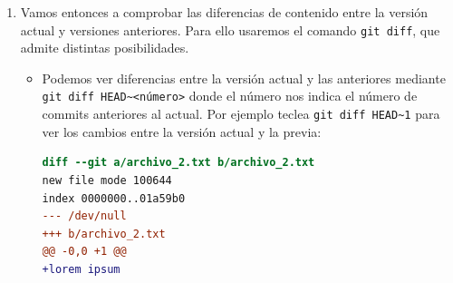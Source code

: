 \documentclass[a4paper,11pt]{report}
\newcommand{\cverb}{\Verb}
\begin{document}
\begin{enumerate}
\begin{lstlisting}[style=custom]
commit 9a9ea9821aed745099708b9f4e551b5516425c5a (HEAD -> main)
Author: hectornieto <hector.nieto.solana@gmail.com>
Date:   Sun May 9 11:53:12 2021 +0200

    Added new module archivo_2

commit f0cf4797ed331ee16d2ac5efe23a41f250436f0f
Author: hectornieto <hector.nieto.solana@gmail.com>
Date:   Sun May 9 11:50:28 2021 +0200

    Added a second line of code

commit 062ccfc2447929add19a36cf6b898b91bd005c90
Author: hectornieto <hector.nieto.solana@gmail.com>
Date:   Sun May 9 11:20:48 2021 +0200

    Fix inital bug

commit ba43a6b0218f5812cd6d4f445231c13819f4bb19
Author: hectornieto <hector.nieto.solana@gmail.com>
Date:   Sun May 9 10:39:02 2021 +0200

    My first commit
    \end{lstlisting}
    
    Por otro lado, con \cverb+git log --oneline+ obtenemos una salida resumida y más fácil de ver del mismo historial:
    \begin{lstlisting}[style=custom]
9a9ea98 (HEAD -> main) Added new module archivo_2
f0cf479 Added a second line of code
062ccfc Fix inital bug
ba43a6b My first commit
    \end{lstlisting}
    con los siete primeros dígitos del id del commit y su descripción\footnote{El id del commit es una frase SHA-1, de 40 dígitos en formato hexadecimal, que incluye la información básica del mismo. Como es probabilísticamente casi imposible que coincidan, uno puede referirse a cualquier commit usando sólo los 7 primeros dígitos}.
    
    El verdadero potencial que tiene \verb+Git+ es que guarda un registro del estado de cada uno de los archivos que hayamos añadido nuestro proyecto, por lo que podemos analizar y restaurar todas y cada una de las versiones que hayamos registrado con \verb+git commit+.
    
    \item Vamos entonces a comprobar las diferencias de contenido entre la versión actual y versiones anteriores. Para ello usaremos el comando \verb+git diff+, que admite distintas posibilidades. 
    \begin{itemize}
      \item Podemos ver diferencias entre la versión actual y las anteriores mediante \cverb+git diff HEAD~<número>+ donde el número nos indica el número de commits anteriores al actual. Por ejemplo teclea 
      \cverb+git diff HEAD~1+ 
      para ver los cambios entre la versión actual y la previa:
      \begin{lstlisting}[language=diff]
diff --git a/archivo_2.txt b/archivo_2.txt
new file mode 100644
index 0000000..01a59b0
--- /dev/null
+++ b/archivo_2.txt
@@ -0,0 +1 @@
+lorem ipsum
      \end{lstlisting}
      

\end{itemize}
\end{enumerate}
\end{document}
